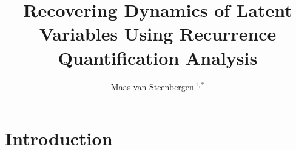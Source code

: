 \documentclass[utf8]{FrontiersinVancouver}
\def\firstAuthorLast{van Steenbergen} %
\def\Authors{Maas van Steenbergen\,$^{1,*}$}
\begin{document}
\onecolumn
{}

\title[Recovering Dynamics Using RQA]{Recovering Dynamics of Latent Variables Using Recurrence Quantification Analysis} 

\author[\firstAuthorLast]{\Authors} %
\address{} %
\correspondance{} %

\extraAuth{}%


\maketitle





\section{Introduction}
\end{document}
